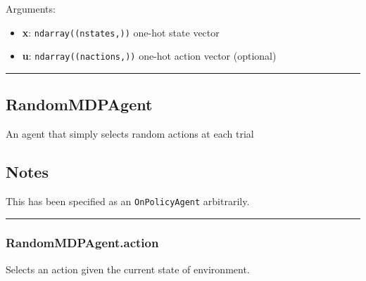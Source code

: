 Arguments:

\begin{itemize}
\tightlist
\item
  \textbf{x}: \texttt{ndarray((nstates,))} one-hot state vector
\item
  \textbf{u}: \texttt{ndarray((nactions,))} one-hot action vector
  (optional)
\end{itemize}

\begin{center}\rule{0.5\linewidth}{\linethickness}\end{center}

\hypertarget{randommdpagent}{%
\subsection{RandomMDPAgent}\label{randommdpagent}}

\begin{Shaded}
\begin{Highlighting}[]
\end{Highlighting}
\end{Shaded}

An agent that simply selects random actions at each trial

\hypertarget{notes}{%
\subsection{Notes}\label{notes}}

This has been specified as an \texttt{OnPolicyAgent} arbitrarily.

\begin{center}\rule{0.5\linewidth}{\linethickness}\end{center}

\hypertarget{randommdpagent.action}{%
\subsubsection{RandomMDPAgent.action}\label{randommdpagent.action}}

\begin{Shaded}
\begin{Highlighting}[]
\end{Highlighting}
\end{Shaded}

Selects an action given the current state of environment.

